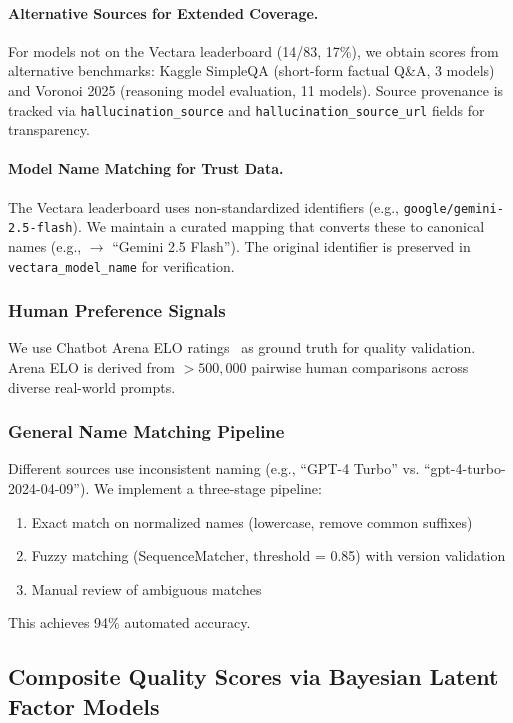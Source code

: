 \paragraph{Alternative Sources for Extended Coverage.}
For models not on the Vectara leaderboard (14/83, 17\%), we obtain scores from alternative benchmarks: Kaggle SimpleQA (short-form factual Q\&A, 3 models) and Voronoi 2025 (reasoning model evaluation, 11 models). Source provenance is tracked via \texttt{hallucination\_source} and \texttt{hallucination\_source\_url} fields for transparency.

\paragraph{Model Name Matching for Trust Data.}
The Vectara leaderboard uses non-standardized identifiers (e.g., \texttt{google/gemini-2.5-flash}). We maintain a curated mapping that converts these to canonical names (e.g., $\rightarrow$ ``Gemini 2.5 Flash''). The original identifier is preserved in \texttt{vectara\_model\_name} for verification.

\subsubsection{Human Preference Signals}

We use Chatbot Arena ELO ratings~\cite{zheng2023arena} as ground truth for quality validation. Arena ELO is derived from $>500{,}000$ pairwise human comparisons across diverse real-world prompts.

\subsubsection{General Name Matching Pipeline}

Different sources use inconsistent naming (e.g., ``GPT-4 Turbo'' vs. ``gpt-4-turbo-2024-04-09''). We implement a three-stage pipeline:
%
\begin{enumerate}[nosep]
\item Exact match on normalized names (lowercase, remove common suffixes)
\item Fuzzy matching (SequenceMatcher, threshold = 0.85) with version validation
\item Manual review of ambiguous matches
\end{enumerate}
%
This achieves 94\% automated accuracy.

\subsection{Composite Quality Scores via Bayesian Latent Factor Models}
\label{sec:blf}

